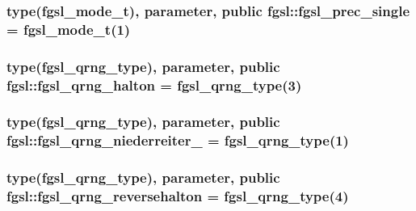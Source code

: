 \subsubsection[{fgsl\+\_\+prec\+\_\+single}]{\setlength{\rightskip}{0pt plus 5cm}type({\bf fgsl\+\_\+mode\+\_\+t}), parameter, public fgsl\+::fgsl\+\_\+prec\+\_\+single = {\bf fgsl\+\_\+mode\+\_\+t}(1)}\label{namespacefgsl_ac6801c472f4316aa060668c157db61bd}
\hypertarget{namespacefgsl_a0d865a8d73c002f671f6e1bc1727966c}{}
\subsubsection[{fgsl\+\_\+qrng\+\_\+halton}]{\setlength{\rightskip}{0pt plus 5cm}type({\bf fgsl\+\_\+qrng\+\_\+type}), parameter, public fgsl\+::fgsl\+\_\+qrng\+\_\+halton = {\bf fgsl\+\_\+qrng\+\_\+type}(3)}\label{namespacefgsl_a0d865a8d73c002f671f6e1bc1727966c}
\hypertarget{namespacefgsl_a3b034ddb20e620b652a5fe35050c0beb}{}
\subsubsection[{fgsl\+\_\+qrng\+\_\+niederreiter\+\_\+2}]{\setlength{\rightskip}{0pt plus 5cm}type({\bf fgsl\+\_\+qrng\+\_\+type}), parameter, public fgsl\+::fgsl\+\_\+qrng\+\_\+niederreiter\+\_ = {\bf fgsl\+\_\+qrng\+\_\+type}(1)}\label{namespacefgsl_a3b034ddb20e620b652a5fe35050c0beb}
\hypertarget{namespacefgsl_a871225c291532b659185f193d97a976a}{}
\subsubsection[{fgsl\+\_\+qrng\+\_\+reversehalton}]{\setlength{\rightskip}{0pt plus 5cm}type({\bf fgsl\+\_\+qrng\+\_\+type}), parameter, public fgsl\+::fgsl\+\_\+qrng\+\_\+reversehalton = {\bf fgsl\+\_\+qrng\+\_\+type}(4)}\label{namespacefgsl_a871225c291532b659185f193d97a976a}
\hypertarget{namespacefgsl_ae1c1dcc2273c7307b2f972c9f04ab69f}{}
